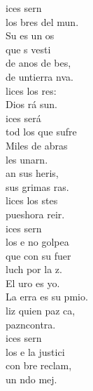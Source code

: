 \begin{cancion}%
	ices sern\\
	los bres del mun.\\
	Su  es un os\\
	que s vesti \\
	de anos de bes,\\
	de untierra nva.\\
	lices los res:\\
	Dios rá sun.\\
\jump
	ices será\\
	tod los que sufre\\
	Miles de abras\\
	les unarn.\\
	an sus heris,\\
	sus grimas ras. \\
	lices los stes\\
	pueshora reir.\\
\jump
	ices sern\\
	los e no golpea\\
	 que con su fuer\\
	luch por la z.\\
	El uro es yo.\\
	La erra es su pmio.\\
	liz quien paz ca,\\
	pazncontra.\\
\jump
	ices sern\\
	los e la justici\\
	con bre reclam,\\
	un ndo mej.\\

\end{cancion}
